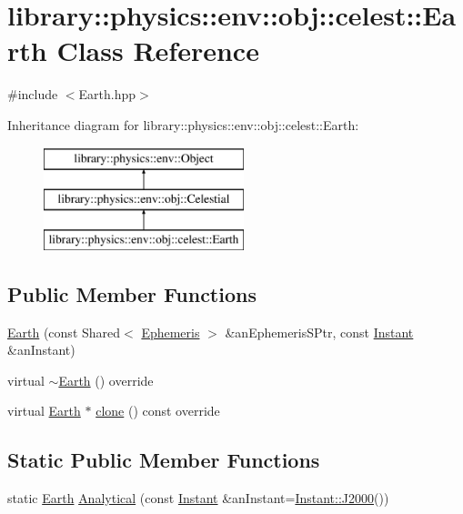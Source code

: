 \hypertarget{classlibrary_1_1physics_1_1env_1_1obj_1_1celest_1_1_earth}{}\section{library\+:\+:physics\+:\+:env\+:\+:obj\+:\+:celest\+:\+:Earth Class Reference}
\label{classlibrary_1_1physics_1_1env_1_1obj_1_1celest_1_1_earth}


{\ttfamily \#include $<$Earth.\+hpp$>$}

Inheritance diagram for library\+:\+:physics\+:\+:env\+:\+:obj\+:\+:celest\+:\+:Earth\+:\begin{figure}[H]
\begin{center}
\leavevmode
\includegraphics[height=3.000000cm]{classlibrary_1_1physics_1_1env_1_1obj_1_1celest_1_1_earth}
\end{center}
\end{figure}
\subsection*{Public Member Functions}
\begin{DoxyCompactItemize}
\item 
\hyperlink{classlibrary_1_1physics_1_1env_1_1obj_1_1celest_1_1_earth_a775057b64077c61329a426260327022c}{Earth} (const Shared$<$ \hyperlink{classlibrary_1_1physics_1_1env_1_1_ephemeris}{Ephemeris} $>$ \&an\+Ephemeris\+S\+Ptr, const \hyperlink{classlibrary_1_1physics_1_1time_1_1_instant}{Instant} \&an\+Instant)
\item 
virtual \hyperlink{classlibrary_1_1physics_1_1env_1_1obj_1_1celest_1_1_earth_a93fbd2015a7c7d786654919197c63963}{$\sim$\+Earth} () override
\item 
virtual \hyperlink{classlibrary_1_1physics_1_1env_1_1obj_1_1celest_1_1_earth}{Earth} $\ast$ \hyperlink{classlibrary_1_1physics_1_1env_1_1obj_1_1celest_1_1_earth_aca39bec00a2046a3fcef9bf22be52428}{clone} () const override
\end{DoxyCompactItemize}
\subsection*{Static Public Member Functions}
\begin{DoxyCompactItemize}
\item 
static \hyperlink{classlibrary_1_1physics_1_1env_1_1obj_1_1celest_1_1_earth}{Earth} \hyperlink{classlibrary_1_1physics_1_1env_1_1obj_1_1celest_1_1_earth_af0456d0dfe17d3cf4473ec02aec1683b}{Analytical} (const \hyperlink{classlibrary_1_1physics_1_1time_1_1_instant}{Instant} \&an\+Instant=\hyperlink{classlibrary_1_1physics_1_1time_1_1_instant_a2a4f57aa71693b8def06788d55bc3bd3}{Instant\+::\+J2000}())
\end{DoxyCompactItemize}
